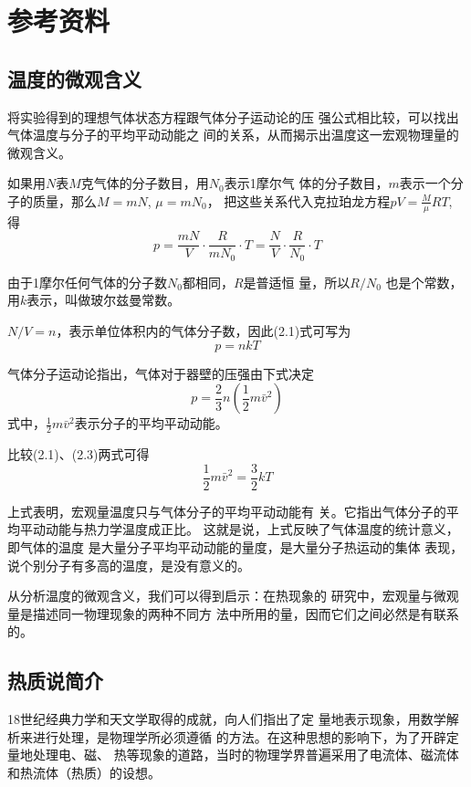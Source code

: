 \section{参考资料}
\subsection{温度的微观含义}
将实验得到的理想气体状态方程跟气体分子运动论的压
强公式相比较，可以找出气体温度与分子的平均平动动能之
间的关系，从而揭示出温度这一宏观物理量的微观含义。

如果用$N$表$M$克气体的分子数目，用$N_0$表示1摩尔气
体的分子数目，$m$表示一个分子的质量，那么$M=mN$, $\mu=mN_0$，
把这些关系代入克拉珀龙方程$pV=\frac{M}{\mu}RT$, 得
\begin{equation}
    p=\frac{mN}{V}\cdot \frac{R}{mN_0}\cdot T=\frac{N}{V}\cdot \frac{R}{N_0}\cdot T
\end{equation}

由于1摩尔任何气体的分子数$N_0$都相同，$R$是普适恒
量，所以$R/N_0$
也是个常数，用$k$表示，叫做玻尔兹曼常数。

$N/V=n$，表示单位体积内的气体分子数，因此(2.1)式可写为
\begin{equation}
    p=nkT
\end{equation}

气体分子运动论指出，气体对于器壁的压强由下式决定
\begin{equation}
    p=\frac{2}{3}n\left(\frac{1}{2}m\bar{v}^2\right)
\end{equation}
式中，$\frac{1}{2}m\bar{v}^2$表示分子的平均平动动能。

比较(2.1)、(2.3)两式可得
\[\frac{1}{2}m\bar{v}^2=\frac{3}{2}kT\]

上式表明，宏观量温度只与气体分子的平均平动动能有
关。它指出气体分子的平均平动动能与热力学温度成正比。
这就是说，上式反映了气体温度的统计意义，即气体的温度
是大量分子平均平动动能的量度，是大量分子热运动的集体
表现，说个别分子有多高的温度，是没有意义的。

从分析温度的微观含义，我们可以得到启示：在热现象的
研究中，宏观量与微观量是描述同一物理现象的两种不同方
法中所用的量，因而它们之间必然是有联系的。

\subsection{热质说简介}

18世纪经典力学和天文学取得的成就，向人们指出了定
量地表示现象，用数学解析来进行处理，是物理学所必须遵循
的方法。在这种思想的影响下，为了开辟定量地处理电、磁、
热等现象的道路，当时的物理学界普遍采用了电流体、磁流体
和热流体（热质）的设想。

